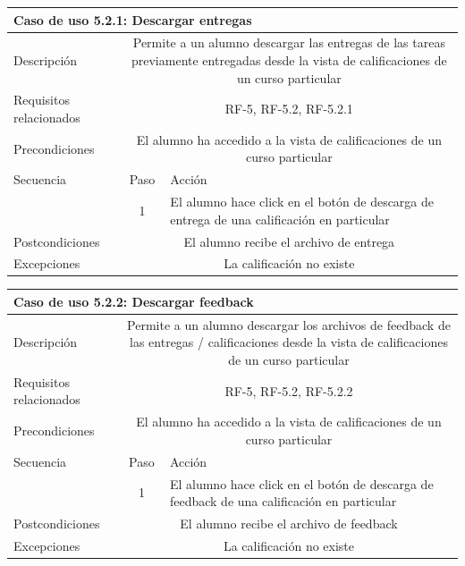 \hspace{3cm}

\begin{tabular}[H]{l c l}
\toprule 
\multicolumn{3}{l}{\textbf{Caso de uso 5.2.1: Descargar entregas}}\\
\midrule
Descripción & \multicolumn{2}{p{10cm}}{Permite a un alumno descargar las entregas de las tareas previamente entregadas desde la vista de calificaciones de un curso particular}\\
\midrule
Requisitos relacionados & \multicolumn{2}{p{10cm}}{RF-5, RF-5.2, RF-5.2.1}\\
\midrule
Precondiciones & \multicolumn{2}{p{10cm}}{El alumno ha accedido a la vista de calificaciones de un curso particular}\\
\midrule
Secuencia & Paso & Acción \\
\cmidrule{2-3}
         & 1 &  \multicolumn{1}{p{8cm}}{El alumno hace click en el botón de descarga de entrega de una calificación en particular}\\
         
\midrule
Postcondiciones & \multicolumn{2}{p{10cm}}{El alumno recibe el archivo de entrega}\\
\midrule
Excepciones  & \multicolumn{2}{p{10cm}}{La calificación no existe}\\
\bottomrule 
\end{tabular}


\hspace{3cm}

\begin{tabular}[H]{l c l}
\toprule 
\multicolumn{3}{l}{\textbf{Caso de uso 5.2.2: Descargar feedback}}\\
\midrule
Descripción & \multicolumn{2}{p{10cm}}{Permite a un alumno descargar los archivos de feedback de las entregas / calificaciones desde la vista de calificaciones de un curso particular}\\
\midrule
Requisitos relacionados & \multicolumn{2}{p{10cm}}{RF-5, RF-5.2, RF-5.2.2}\\
\midrule
Precondiciones & \multicolumn{2}{p{10cm}}{El alumno ha accedido a la vista de calificaciones de un curso particular}\\
\midrule
Secuencia & Paso & Acción \\
\cmidrule{2-3}
         & 1 &  \multicolumn{1}{p{8cm}}{El alumno hace click en el botón de descarga de feedback de una calificación en particular}\\
         
\midrule
Postcondiciones & \multicolumn{2}{p{10cm}}{El alumno recibe el archivo de feedback}\\
\midrule
Excepciones  & \multicolumn{2}{p{10cm}}{La calificación no existe}\\
\bottomrule 
\end{tabular}


